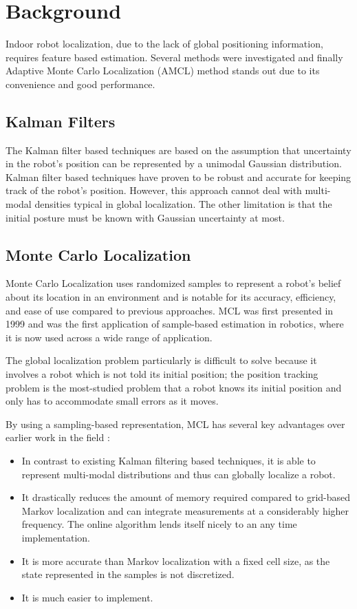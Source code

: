 \documentclass[10pt,journal,compsoc]{IEEEtran}
\begin{document}
\section{Background}

Indoor robot localization, due to the lack of global positioning information, requires feature based estimation. Several methods were investigated and finally Adaptive Monte Carlo Localization (AMCL) method stands out due to its convenience and good performance. 

\subsection{Kalman Filters}

The Kalman filter based techniques are based on the assumption that uncertainty in the robot’s position can be represented by a unimodal Gaussian distribution. Kalman filter based techniques have proven to be robust and accurate for keeping track of the robot’s position. However, this approach cannot deal with multi-modal densities typical in global localization. The other limitation is that the initial posture must be known with Gaussian uncertainty at most. 

\subsection{Monte Carlo Localization}

Monte Carlo Localization uses randomized samples to represent a robot’s belief about its location in an environment and is notable for its accuracy, efficiency, and ease of use compared to previous approaches. MCL was first presented in 1999 \cite{mcl-intro} and was the first application of sample-based estimation in robotics, where it is now used across a wide range of application.

The global localization problem particularly is difficult to solve because it involves a robot which is not told its initial position; the position tracking problem is the most-studied problem that a robot knows its initial position and only has to accommodate small errors as it moves.

By using a sampling-based representation, MCL has several key advantages over earlier work in the field \cite{acl-advantages}:

\begin{itemize}
    \item In contrast to existing Kalman filtering based techniques, it is able to represent multi-modal distributions and thus can globally localize a robot.
    \item It drastically reduces the amount of memory required compared to grid-based Markov localization and can integrate measurements at a considerably higher frequency. The online algorithm lends itself nicely to an any time implementation.
    \item It is more accurate than Markov localization with a fixed cell size, as the state represented in the samples is not discretized.
    \item It is much easier to implement.
\end{itemize}
\end{document}
